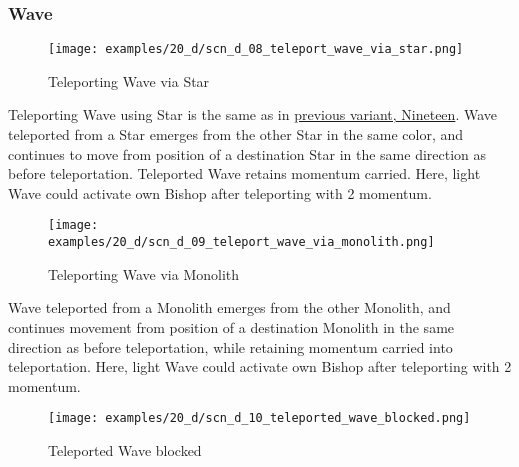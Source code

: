 \subsubsection*{Wave}

\vspace*{-1.2\baselineskip}
\noindent
\begin{figure}[!h]
\texttt{[image: examples/20\_d/scn\_d\_08\_teleport\_wave\_via\_star.png]}
\caption{Teleporting Wave via Star}
\label{fig:scn_d_08_teleport_wave_via_star}
\end{figure}

Teleporting Wave using Star is the same as in \hyperref[fig:scn_n_04_teleport_move_3]{previous variant, Nineteen}.
Wave teleported from a Star emerges from the other Star in the same color,
and continues to move from position of a destination Star in the same
direction as before teleportation. Teleported Wave retains momentum carried.
Here, light Wave could activate own Bishop after teleporting with 2 momentum.

\clearpage %

\noindent
\begin{figure}[!h]
\texttt{[image: examples/20\_d/scn\_d\_09\_teleport\_wave\_via\_monolith.png]}
\caption{Teleporting Wave via Monolith}
\label{fig:scn_d_09_teleport_wave_via_monolith}
\end{figure}

Wave teleported from a Monolith emerges from the other Monolith, and continues
movement from position of a destination Monolith in the same direction as before
teleportation, while retaining momentum carried into teleportation.
Here, light Wave could activate own Bishop after teleporting with 2 momentum.

\clearpage %

\noindent
\begin{figure}[!h]
\texttt{[image: examples/20\_d/scn\_d\_10\_teleported\_wave\_blocked.png]}
\caption{Teleported Wave blocked}
\label{fig:scn_d_10_teleported_wave_blocked}
\end{figure}

